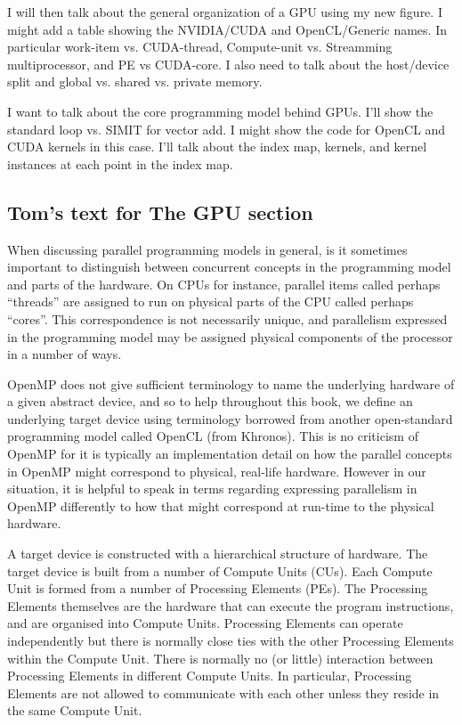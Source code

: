 I will then talk about the general organization of a GPU using my new figure.  I might add a table showing the NVIDIA/CUDA 
and OpenCL/Generic names.  In particular work-item vs. CUDA-thread, Compute-unit vs. Streamming multiprocessor, 
and PE vs CUDA-core.  I also need to talk about the host/device split and global vs. shared vs. private memory.

I want to talk about the core programming  model behind GPUs.  I'll show the standard loop vs. SIMIT for vector add.  I might
show the code for OpenCL and CUDA kernels in this case.  I'll talk about the index map, kernels, and kernel instances at each point
in the index map.


\subsection{Tom's text for The GPU section}

When discussing parallel programming models in general, is it sometimes important to distinguish between concurrent concepts in the programming model and parts of the hardware.
On CPUs for instance, parallel items called perhaps ``threads'' are assigned to run on physical parts of the CPU called perhaps ``cores''.
This correspondence is not necessarily unique, and parallelism expressed in the programming model may be assigned physical components of the processor in a number of ways.

OpenMP does not give sufficient terminology to name the underlying hardware of a given abstract device, and so to help throughout this book, we define an underlying target device using terminology borrowed from another open-standard programming model called OpenCL (from Khronos).
This is no criticism of OpenMP for it is typically an implementation detail on how the parallel concepts in OpenMP might correspond to physical, real-life hardware.
However in our situation, it is helpful to speak in terms regarding expressing parallelism in OpenMP differently to how that might correspond at run-time to the physical hardware.

A target device is constructed with a hierarchical structure of hardware.
The target device is built from a number of Compute Units (CUs).
Each Compute Unit is formed from a number of Processing Elements (PEs).
The Processing Elements themselves are the hardware that can execute the program instructions, and are organised into Compute Units.
Processing Elements can operate independently but there is normally close ties with the other Processing Elements within the Compute Unit.
There is normally no (or little) interaction between Processing Elements in different Compute Units.
In particular, Processing Elements are not allowed to communicate with each other unless they reside in the same Compute Unit.

